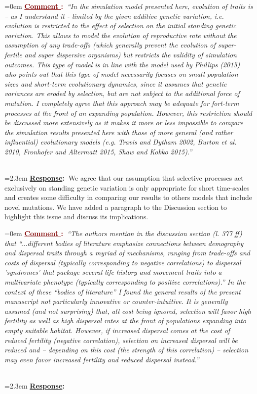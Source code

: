 \documentclass[12pt]{article}
\newcounter{cN}
\newcommand{\comment}[1]{
	\vspace{2em}
	\refstepcounter{cN} %
	\noindent \hangindent=0em \textbf{\textcolor{Maroon}{\uline{Comment \thecN}:~}}\emph{``#1''}
	}
\newcommand{\response}[1]{
	\\[0.25em]
	\hangindent=2.3em \textbf{\textcolor{NavyBlue}{\uline{Response}:~}}#1
	}
\begin{document}
\comment{In the simulation model presented here, evolution of traits is – as I understand it - limited by the given additive genetic variation, i.e. evolution is restricted to the effect of selection on the initial standing genetic variation.
This allows to model the evolution of reproductive rate without the assumption of any trade-offs (which generally prevent the evolution of super-fertile and super dispersive organisms) but restricts the validity of simulation outcomes.
This type of model is in line with the model used by Phillips (2015) who points out that this type of model necessarily focuses on small population sizes and short-term evolutionary dynamics, since it assumes that genetic variances are eroded by selection, but are not subject to the additional force of mutation.
I completely agree that this approach may be adequate for fort-term processes at the front of an expanding population.
However, this restriction should be discussed more extensively as it makes it more or less impossible to compare the simulation results presented here with those of more general (and rather influential) evolutionary models (e.g. Travis and Dytham 2002, Burton et al. 2010, Fronhofer and Altermatt 2015, Shaw and Kokko 2015).}
\response{We agree that our assumption that selective processes act exclusively on standing genetic variation is only appropriate for short time-scales and creates some difficulty in comparing our results to others models that include novel mutations. We have added a paragraph to the Discussion section to highlight this issue and discuss its implications.}

\comment{The authors mention in the discussion section (l. 377 ff) that ``...different bodies of literature emphasize connections between demography and dispersal traits through a myriad of mechanisms, ranging from trade-offs and costs of dispersal (typically corresponding to negative correlations) to dispersal 'syndromes' that package several life history and movement traits into a multivariate phenotype (typically corresponding to positive correlations).''
In the context of these ``bodies of literature'' I found the general results of the present manuscript not particularly innovative or counter-intuitive.
It is generally assumed (and not surprising) that, all cost being ignored, selection will favor high fertility as well as high dispersal rates at the front of populations expanding into empty suitable habitat.
However, if increased dispersal comes at the cost of reduced fertility (negative correlation), selection on increased dispersal will be reduced and – depending on this cost (the strength of this correlation) – selection may even favor increased fertility and reduced dispersal instead.}
\response{}
\end{document}
